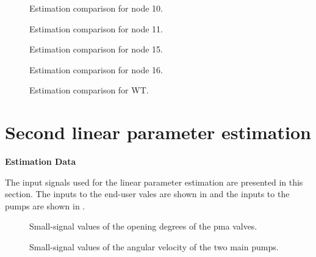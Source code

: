 \begin{figure}[H]
  \centering
  \begin{minipage}[b]{0.45\textwidth}
     
    \caption{Estimation comparison for node 10.}
  \end{minipage}
  \hfill
  \begin{minipage}[b]{0.45\textwidth}
     
    \caption{Estimation comparison for node 11.}
  \end{minipage}
\end{figure}

\begin{figure}[H]
  \centering
  \begin{minipage}[b]{0.45\textwidth}
     
    \caption{Estimation comparison for node 15.}
  \end{minipage}
  \hfill
  \begin{minipage}[b]{0.45\textwidth}
     
    \caption{Estimation comparison for node 16.}
  \end{minipage}
\end{figure}

\begin{figure}[H]
 \centering
     
    \caption{Estimation comparison for WT.}
\end{figure}

\section{Second linear parameter estimation}
\label{LinResults_2}
\textbf{Estimation Data}

The input signals used for the linear parameter estimation are presented in this section.  
The inputs to the end-user vales are shown in  and the inputs to the pumps are shown in . 


\begin{figure}[H]
  \centering
  \begin{minipage}[b]{0.45\textwidth}
     
    \caption{Small-signal values of the opening degrees of the pma valves. }
    \label{fig:est_OD_data}
  \end{minipage}
  \hfill
  \begin{minipage}[b]{0.45\textwidth}
     
    \caption{Small-signal values of the angular velocity of the two main pumps.}
    \label{fig:est_deltap_data}
  \end{minipage}
\end{figure}


